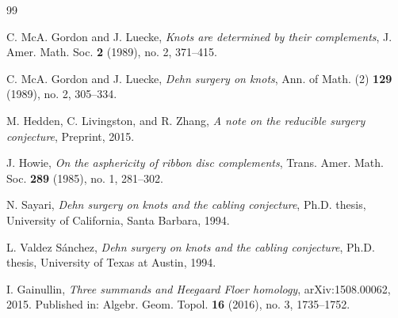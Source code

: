 \documentclass[11pt]{article}
\begin{document}
\begin{thebibliography}{99}

C. McA. Gordon and J. Luecke,
\emph{Knots are determined by their complements},
J. Amer. Math. Soc. \textbf{2} (1989), no. 2, 371--415.

C. McA. Gordon and J. Luecke,
\emph{Dehn surgery on knots},
Ann. of Math. (2) \textbf{129} (1989), no. 2, 305--334.

M. Hedden, C. Livingston, and R. Zhang,
\emph{A note on the reducible surgery conjecture},
Preprint, 2015.

J. Howie,
\emph{On the asphericity of ribbon disc complements},
Trans. Amer. Math. Soc. \textbf{289} (1985), no. 1, 281--302.

N. Sayari,
\emph{Dehn surgery on knots and the cabling conjecture},
Ph.D. thesis, University of California, Santa Barbara, 1994.

L. Valdez S\'anchez,
\emph{Dehn surgery on knots and the cabling conjecture},
Ph.D. thesis, University of Texas at Austin, 1994.

I. Gainullin,
\emph{Three summands and Heegaard Floer homology},
arXiv:1508.00062, 2015.
Published in: Algebr. Geom. Topol. \textbf{16} (2016), no. 3, 1735--1752.

\end{thebibliography}
\end{document}
